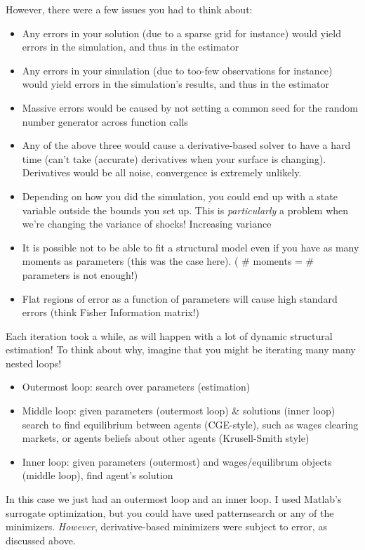 \documentclass[11pt]{article}
\begin{document}
However, there were a few issues you had to think about:
\begin{itemize}
\item Any errors in your solution (due to a sparse grid for instance) would yield errors in the simulation, and thus in the estimator
\item Any errors in your simulation (due to too-few observations for instance) would yield errors in the simulation's results, and thus in the estimator
\item Massive errors would be caused by not setting a common seed for the random number generator across function calls
\item Any of the above three would cause a derivative-based solver to have a hard time (can't take (accurate) derivatives when your surface is changing).  Derivatives would be all noise, convergence is extremely unlikely.
\item Depending on how you did the simulation, you could end up with a state variable outside the bounds you set up.  This is \emph{particularly} a problem when we're changing the variance of shocks!  Increasing variance 
\item It is possible not to be able to fit a structural model even if you have as many moments as parameters (this was the case here). ( \# moments = \# parameters is not enough!)
\item Flat regions of error as a function of parameters will cause high standard errors (think Fisher Information matrix!)
\end{itemize}

Each iteration took a while, as will happen with a lot of dynamic structural estimation!  To think about why, imagine that you might be iterating many many nested loops!
\begin{itemize}
\item Outermost loop:  search over parameters (estimation)
\item Middle loop: given parameters (outermost loop) \& solutions (inner loop) search to find equilibrium between agents (CGE-style), such as wages clearing markets, or agents beliefs about other agents (Krusell-Smith style)
\item Inner loop:  given parameters (outermost) and wages/equilibrum objects (middle loop), find agent's solution
\end{itemize}
In this case we just had an outermost loop and an inner loop.  I used Matlab's surrogate optimization, but you could have used patternsearch or any of the minimizers.  \emph{However}, derivative-based minimizers were subject to error, as discussed above.\\
\end{document}
